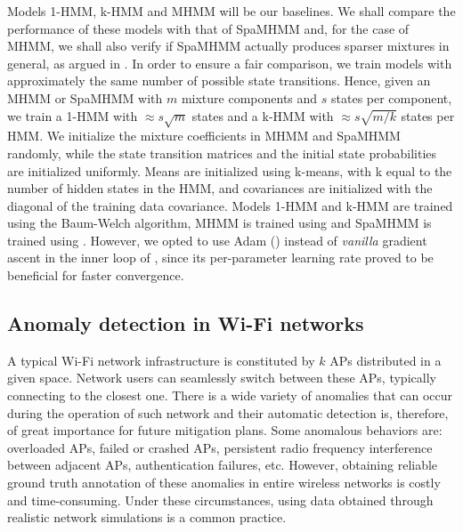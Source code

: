 Models 1-HMM, k-HMM and MHMM will be our baselines. We shall compare the performance of these models with that of SpaMHMM and, for the case of MHMM, we shall also verify if SpaMHMM actually produces sparser mixtures in general, as argued in . In order to ensure a fair comparison, we train models with approximately the same number of possible state transitions. Hence, given an MHMM or SpaMHMM with $m$ mixture components and $s$ states per component, we train a 1-HMM with $\approx s\sqrt{m}$ states and a k-HMM with $\approx s\sqrt{m/k}$ states per HMM. We initialize the mixture coefficients in MHMM and SpaMHMM randomly, while the state transition matrices and the initial state probabilities are initialized uniformly. Means are initialized using k-means, with k equal to the number of hidden states in the HMM, and covariances are initialized with the diagonal of the training data covariance. Models 1-HMM and k-HMM are trained using the Baum-Welch algorithm, MHMM is trained using  and SpaMHMM is trained using . However, we opted to use Adam (\citet{Kingma2014}) instead of \textit{vanilla} gradient ascent in the inner loop of , since its per-parameter learning rate proved to be beneficial for faster convergence.

\subsection{Anomaly detection in Wi-Fi networks}
\label{sec:wi_fi}
A typical Wi-Fi network infrastructure is constituted by $k$ APs distributed in a given space. Network users can seamlessly switch between these APs, typically connecting to the closest one. There is a wide variety of anomalies that can occur during the operation of such network and their automatic detection is, therefore, of great importance for future mitigation plans. Some anomalous behaviors are: overloaded APs, failed or crashed APs, persistent radio frequency interference between adjacent APs, authentication failures, etc. However, obtaining reliable ground truth annotation of these anomalies in entire wireless networks is costly and time-consuming. Under these circumstances, using data obtained through realistic network simulations is a common practice.

